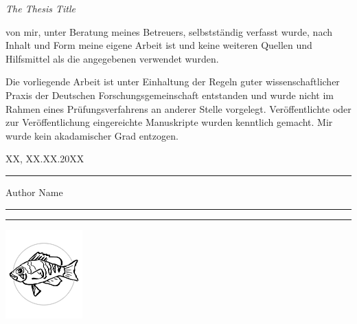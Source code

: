 \documentclass[12pt, openany]{book}
\def\MYTITLE{The Thesis Title}
\def\MYAUTHOR{Author Name}
\begin{document}
\textit{\MYTITLE}\vspace{1em}

von mir, unter Beratung meines Betreuers, selbstständig verfasst wurde, nach Inhalt und Form meine eigene Arbeit ist und keine weiteren Quellen und Hilfsmittel als die angegebenen verwendet wurden.

\noindent{}Die vorliegende Arbeit ist unter Einhaltung der Regeln guter wissenschaftlicher Praxis der Deutschen Forschungsgemeinschaft entstanden und wurde nicht im Rahmen eines Prüfungsverfahrens an anderer Stelle vorgelegt.
Veröffentlichte oder zur Veröffentlichung eingereichte Manuskripte wurden kenntlich gemacht.
Mir wurde kein akadamischer Grad entzogen.\\\vspace{.07\paperheight}

\noindent{}XX, XX.XX.20XX\hfill{}\rule{.25\textwidth}{0.4pt}

\hfill{}\MYAUTHOR\hspace*{.04\textwidth}\\

\newpage
{}
\thispagestyle{empty}
\textcolor{white!90}{\hrule}\vspace*{1em}
\vfill

\textcolor{white!90}{\hrule}\vspace*{.15em}
\hfil\includegraphics[width = 8em]{images/logo.pdf}
\end{document}
